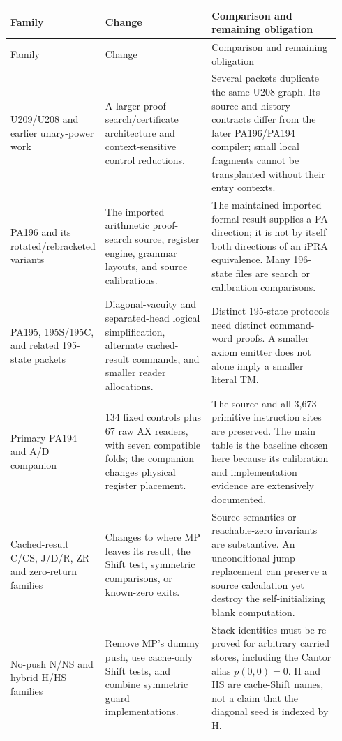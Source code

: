 \documentclass[11pt]{article}
\begin{document}
\begin{longtable}{@{}p{0.20\linewidth}p{0.33\linewidth}p{0.41\linewidth}@{}}
\toprule
Family & Change & Comparison and remaining obligation\\
\midrule\endfirsthead
\toprule Family & Change & Comparison and remaining obligation\\\midrule\endhead
U209/U208 and earlier unary-power work & A larger proof-search/certificate architecture and context-sensitive control reductions. & Several packets duplicate the same U208 graph. Its source and history contracts differ from the later PA196/PA194 compiler; small local fragments cannot be transplanted without their entry contexts.\\[4pt]
PA196 and its rotated/rebracketed variants & The imported arithmetic proof-search source, register engine, grammar layouts, and source calibrations. & The maintained imported formal result supplies a PA direction; it is not by itself both directions of an iPRA equivalence. Many 196-state files are search or calibration comparisons.\\[4pt]
PA195, 195S/195C, and related 195-state packets & Diagonal-vacuity and separated-head logical simplification, alternate cached-result commands, and smaller reader allocations. & Distinct 195-state protocols need distinct command-word proofs. A smaller axiom emitter does not alone imply a smaller literal TM.\\[4pt]
Primary PA194 and A/D companion & 134 fixed controls plus 67 raw AX readers, with seven compatible folds; the companion changes physical register placement. & The source and all 3,673 primitive instruction sites are preserved. The main table is the baseline chosen here because its calibration and implementation evidence are extensively documented.\\[4pt]
Cached-result C/CS, J/D/R, ZR and zero-return families & Changes to where MP leaves its result, the Shift test, symmetric comparisons, or known-zero exits. & Source semantics or reachable-zero invariants are substantive. An unconditional jump replacement can preserve a source calculation yet destroy the self-initializing blank computation.\\[4pt]
No-push N/NS and hybrid H/HS families & Remove MP's dummy push, use cache-only Shift tests, and combine symmetric guard implementations. & Stack identities must be re-proved for arbitrary carried stores, including the Cantor alias \(p(0,0)=0\). H and HS are cache-Shift names, not a claim that the diagonal seed is indexed by H.\\[4pt]

\end{longtable}
\end{document}

